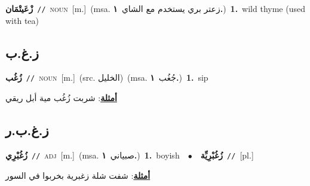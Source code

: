 \documentclass[10pt,a4paper,twoside]{article} %
\begin{document}
\begin{multicols}{2}
{\setlength\topsep{0pt}\textbf{\foreignlanguage{arabic}{زْعَيتْمَان}}\ {\color{gray}\texttt{//}\color{black}}\ \textsc{noun}\ [m.]\ \color{gray}(msa. \foreignlanguage{arabic}{زعتر بري يستخدم مع الشاي}~\foreignlanguage{arabic}{\textbf{١.}})\color{black}\ \textbf{1.}~wild thyme (used with tea)\ } \vspace{2mm}

\vspace{-3mm}
\subsection*{\color{blue}\foreignlanguage{arabic}{ز.غ.ب}\color{blue}{}} 

{\setlength\topsep{0pt}\textbf{\foreignlanguage{arabic}{زُغُب}}\ {\color{gray}\texttt{//}\color{black}}\ \textsc{noun}\ [m.]\ (src. \color{gray}\foreignlanguage{arabic}{الخليل}\color{black})\ \color{gray}(msa. \foreignlanguage{arabic}{جُغُب}~\foreignlanguage{arabic}{\textbf{١.}})\color{black}\ \textbf{1.}~sip\  \begin{flushright}\color{gray}\foreignlanguage{arabic}{\textbf{\underline{\foreignlanguage{arabic}{أمثلة}}}: شربت زُغُب مية أبل ريقي}\end{flushright}\color{black}} \vspace{2mm}

\vspace{-3mm}
\subsection*{\color{blue}\foreignlanguage{arabic}{ز.غ.ب.ر}\color{blue}{}} 

{\setlength\topsep{0pt}\textbf{\foreignlanguage{arabic}{زُغُبْرِي}}\ {\color{gray}\texttt{//}\color{black}}\ \textsc{adj}\ [m.]\ \color{gray}(msa. \foreignlanguage{arabic}{صبياني}~\foreignlanguage{arabic}{\textbf{١.}})\color{black}\ \textbf{1.}~boyish\ \ $\bullet$\ \ \setlength\topsep{0pt}\textbf{\foreignlanguage{arabic}{زُغُبْرِيِّة}}\ {\color{gray}\texttt{//}\color{black}}\ [pl.]\  \begin{flushright}\color{gray}\foreignlanguage{arabic}{\textbf{\underline{\foreignlanguage{arabic}{أمثلة}}}: شفت شلة زغبرية بخربوا في السور}\end{flushright}\color{black}} \vspace{2mm}


\end{multicols}
\end{document}
